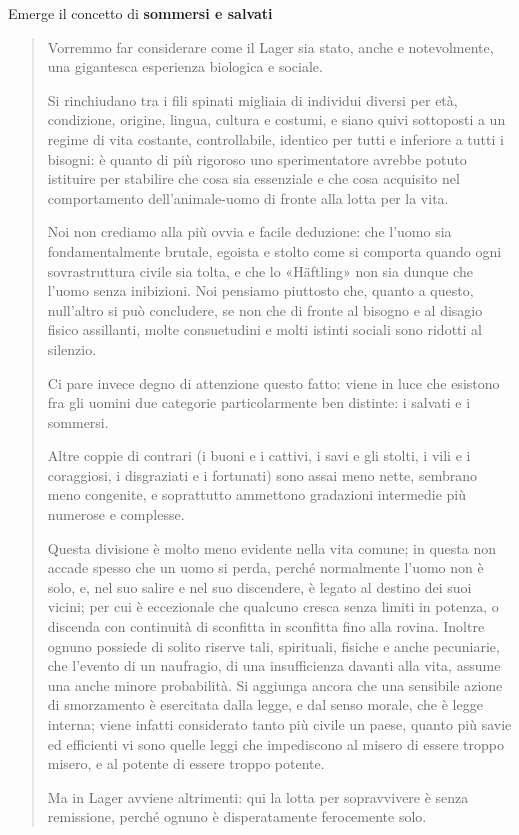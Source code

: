 \documentclass[a4paper, twoside, titlepage]{book}
\newcommand{\citazione}[1]{%
  \begin{quotation}
  \begin{linenumbers}
  \modulolinenumbers[5]
  \begingroup
  \setlength{\parindent}{0cm}
  \noindent #1
  \endgroup
  \end{linenumbers}
  \end{quotation}\setcounter{linenumber}{1}
  }
\begin{document}
Emerge il concetto di \textbf{sommersi e salvati}
\citazione{ Vorremmo far considerare come il Lager sia stato, anche e notevolmente, una gigantesca esperienza biologica e sociale.

Si rinchiudano tra i fili spinati migliaia di individui diversi per età, condizione, origine, lingua, cultura e costumi, e siano quivi sottoposti a un regime di vita costante, controllabile, identico per tutti e inferiore a tutti i bisogni: è quanto di più rigoroso uno sperimentatore avrebbe potuto istituire per stabilire che cosa sia essenziale e che cosa acquisito nel comportamento dell'animale-uomo di fronte alla lotta per la vita.

Noi non crediamo alla più ovvia e facile deduzione: che l'uomo sia fondamentalmente brutale, egoista e stolto come si comporta quando ogni sovrastruttura civile sia tolta, e che lo «Häftling» non sia dunque che l'uomo senza inibizioni. Noi pensiamo piuttosto che, quanto a questo, null'altro si può concludere, se non che di fronte al bisogno e al disagio fisico assillanti, molte consuetudini e molti istinti sociali sono ridotti al silenzio.

Ci pare invece degno di attenzione questo fatto: viene in luce che esistono fra gli uomini due categorie particolarmente ben distinte: i salvati e i sommersi.

Altre coppie di contrari (i buoni e i cattivi, i savi e gli stolti, i vili e i coraggiosi, i disgraziati e i fortunati) sono assai meno nette, sembrano meno congenite, e soprattutto ammettono gradazioni intermedie più numerose e complesse.

Questa divisione è molto meno evidente nella vita comune; in questa non accade spesso che un uomo si perda, perché normalmente l'uomo non è solo, e, nel suo salire e nel suo discendere, è legato al destino dei suoi vicini; per cui è eccezionale che qualcuno cresca senza limiti in potenza, o discenda con continuità di sconfitta in sconfitta fino alla rovina. Inoltre ognuno possiede di solito riserve tali, spirituali, fisiche e anche pecuniarie, che l'evento di un naufragio, di una insufficienza davanti alla vita, assume una anche minore probabilità. Si aggiunga ancora che una sensibile azione di smorzamento è esercitata dalla legge, e dal senso morale, che è legge interna; viene infatti considerato tanto più civile un paese, quanto più savie ed efficienti vi sono quelle leggi che impediscono al misero di essere troppo misero, e al potente di essere troppo potente.

Ma in Lager avviene altrimenti: qui la lotta per sopravvivere è senza remissione, perché ognuno è disperatamente ferocemente solo.}
\end{document}
